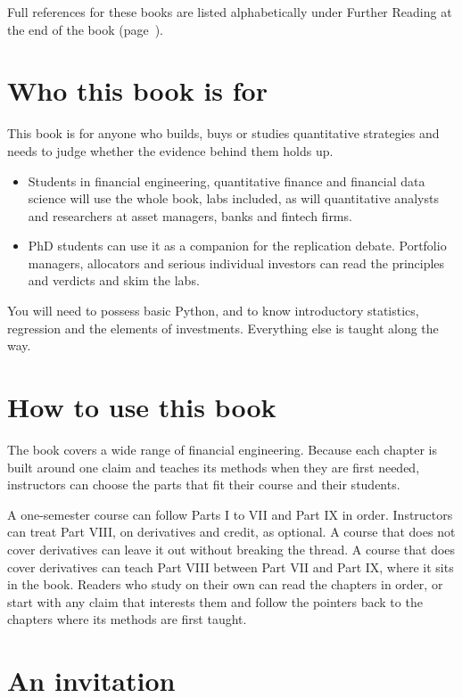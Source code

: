 Full references for these books are listed alphabetically under Further Reading at the end of the book (page~\pageref{furtherreading}).


\section*{Who this book is for}

This book is for anyone who builds, buys or studies quantitative strategies and needs to judge whether the evidence behind them holds up.

\begin{itemize}
  \item Students in financial engineering, quantitative finance and financial data science will use the whole book, labs included, as will quantitative analysts and researchers at asset managers, banks and fintech firms.
  \item PhD students can use it as a companion for the replication debate. Portfolio managers, allocators and serious individual investors can read the principles and verdicts and skim the labs.
\end{itemize}

You will need to possess basic Python, and to know introductory statistics, regression and the elements of investments. Everything else is taught along the way.

\section*{How to use this book}

The book covers a wide range of financial engineering. Because each chapter is built around one claim and teaches its methods when they are first needed, instructors can choose the parts that fit their course and their students.

A one-semester course can follow Parts I to VII and Part IX in order. Instructors can treat Part VIII, on derivatives and credit, as optional. A course that does not cover derivatives can leave it out without breaking the thread. A course that does cover derivatives can teach Part VIII between Part VII and Part IX, where it sits in the book.
Readers who study on their own can read the chapters in order, or start with any claim that interests them and follow the pointers back to the chapters where its methods are first taught. 

\section*{An invitation}

